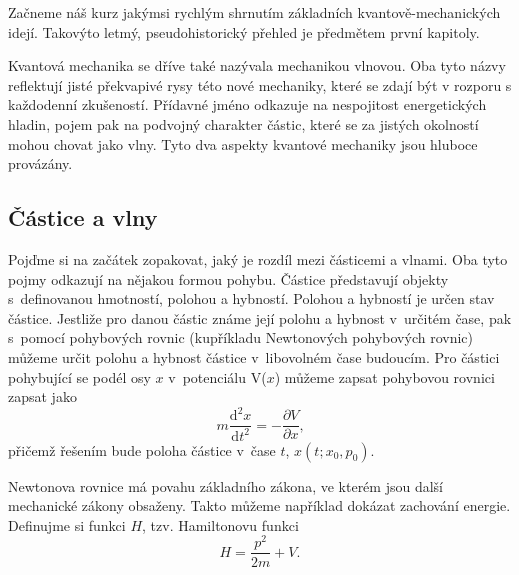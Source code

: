 \newcommand{\dd}{\mathrm{d}}

Začneme náš kurz jakýmsi rychlým shrnutím základních kvantově-mechanických idejí. Takovýto letmý, pseudohistorický přehled je předmětem první kapitoly.

Kvantová mechanika se dříve také nazývala mechanikou vlnovou. Oba tyto názvy reflektují jisté překvapivé rysy této nové mechaniky, které se zdají být v rozporu s každodenní zkušeností. Přídavné jméno  odkazuje na nespojitost energetických hladin, pojem  pak na podvojný charakter částic, které se za jistých okolností mohou chovat jako vlny. Tyto dva aspekty kvantové mechaniky jsou hluboce provázány.

\subsection{Částice a vlny}	
Pojďme si na začátek zopakovat, jaký je rozdíl mezi částicemi a vlnami. Oba tyto pojmy odkazují na nějakou formou pohybu. Částice představují objekty s~definovanou hmotností, polohou a hybností. Polohou a hybností je určen stav částice. Jestliže pro danou částic známe její polohu a hybnost v~určitém čase, pak s~pomocí pohybových rovnic (kupříkladu Newtonových pohybových rovnic) můžeme určit polohu a hybnost částice v~libovolném čase budoucím. Pro částici pohybující se podél osy $x$ v~potenciálu V($x$) můžeme zapsat pohybovou rovnici zapsat jako
\begin{equation}
m \frac{\mathrm{d}^2 x}{\mathrm{d}t^2} = -\frac{\partial{V}}{\partial{x}}  \mbox{,}
\label{rov:Castice}
\end{equation}
přičemž řešením bude poloha částice v~čase $t$, $x(t; x_0,p_0)$.

Newtonova rovnice má povahu základního zákona, ve kterém jsou další mechanické zákony obsaženy. Takto můžeme například dokázat zachování energie. Definujme si funkci $H$, tzv. Hamiltonovu funkci
\begin{equation}
H = \frac{p^2}{2m}+V\mbox{.}
\label{rov:hamiltonfce}
\end{equation}

